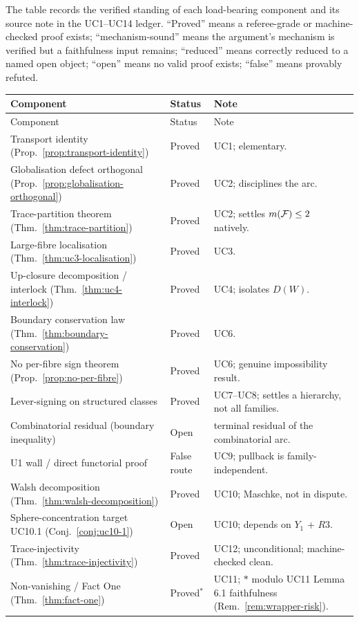 The table records the verified standing of each load-bearing component
and its source note in the UC1--UC14 ledger. ``Proved'' means a
referee-grade or machine-checked proof exists; ``mechanism-sound''
means the argument's mechanism is verified but a faithfulness input
remains; ``reduced'' means correctly reduced to a named open object;
``open'' means no valid proof exists; ``false'' means provably
refuted.

\begin{longtable}{p{}p{}p{}}
\toprule
Component & Status & Note \\
\midrule
\endfirsthead
\toprule
Component & Status & Note \\
\midrule
\endhead
\bottomrule
\endfoot
Transport identity (Prop.~\ref{prop:transport-identity}) & Proved & UC1; elementary. \\
Globalisation defect orthogonal (Prop.~\ref{prop:globalisation-orthogonal}) & Proved & UC2; disciplines the arc. \\
Trace-partition theorem (Thm.~\ref{thm:trace-partition}) & Proved & UC2; settles $m(\mathcal{F})\le2$ natively. \\
Large-fibre localisation (Thm.~\ref{thm:uc3-localisation}) & Proved & UC3. \\
Up-closure decomposition / interlock (Thm.~\ref{thm:uc4-interlock}) & Proved & UC4; isolates $D(W)$. \\
Boundary conservation law (Thm.~\ref{thm:boundary-conservation}) & Proved & UC6. \\
No per-fibre sign theorem (Prop.~\ref{prop:no-per-fibre}) & Proved & UC6; genuine impossibility result. \\
Lever-signing on structured classes & Proved & UC7--UC8; settles a hierarchy, not all families. \\
Combinatorial residual (boundary inequality) & Open & terminal residual of the combinatorial arc. \\
U1 wall / direct functorial proof & False route & UC9; pullback is family-independent. \\
Walsh decomposition (Thm.~\ref{thm:walsh-decomposition}) & Proved & UC10; Maschke, not in dispute. \\
Sphere-concentration target UC10.1 (Conj.~\ref{conj:uc10-1}) & Open & UC10; depends on $Y_1$ + $R3$. \\
Trace-injectivity (Thm.~\ref{thm:trace-injectivity}) & Proved & UC12; unconditional; machine-checked clean. \\
Non-vanishing / Fact One (Thm.~\ref{thm:fact-one}) & Proved$^\ast$ & UC11; $\ast$ modulo UC11 Lemma 6.1 faithfulness (Rem.~\ref{rem:wrapper-risk}). \\

\end{longtable}
